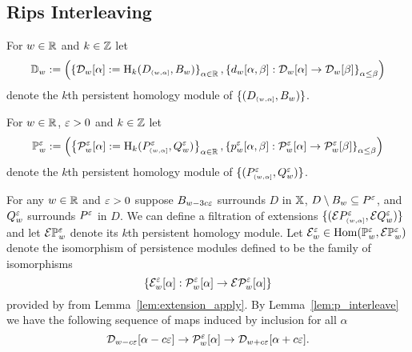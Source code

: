 
\subsection{Rips Interleaving}

For $w\in\mathbb{R}$ and $k\in\mathbb{Z}$ let
\[ \mathbb{D}_{w} := \left(\left\{\mathcal{D}_{w}[\alpha] := \mathrm{H}_k(D_{\scriptscriptstyle (w,\alpha]},B_w)\right\}_{\alpha\in\mathbb{R}},\left\{d_w[\alpha,\beta] : \mathcal{D}_{w}[\alpha]\to\mathcal{D}_{w}[\beta]\right\}_{\alpha\leq\beta}\right)\]
denote the $k$th persistent homology module of $\{(D_{\scriptscriptstyle (w,\alpha]},B_w)\}$.

For $w\in\mathbb{R}$, $\varepsilon > 0$ and $k\in\mathbb{Z}$ let
\[\mathbb{P}_{w}^{\varepsilon} := \left(\left\{\mathcal{P}_{w}^{\varepsilon}[\alpha] := \mathrm{H}_k(P_{\scriptscriptstyle (w,\alpha]}^\varepsilon,Q_w^\varepsilon)\right\}_{\alpha\in\mathbb{R}}, \left\{p_w^\varepsilon[\alpha,\beta] : \mathcal{P}_{w}^{\varepsilon}[\alpha]\to\mathcal{P}_{w}^{\varepsilon}[\beta]\right\}_{\alpha\leq\beta}\right)\]
denote the $k$th persistent homology module of $\{(P_{\scriptscriptstyle (w,\alpha]}^\varepsilon,Q_w^\varepsilon)\}$.

For any $w\in\mathbb{R}$ and $\varepsilon > 0$ suppose $B_{w-3c\varepsilon}$ surrounds $D$ in $\mathbb{X}$, $D\setminus B_w \subseteq P^\varepsilon$, and $Q_w^\varepsilon$ surrounds $P^\varepsilon$ in $D$.
We can define a filtration of extensions $\{(\mathcal{E} P_{\scriptscriptstyle (w,\alpha]}^\varepsilon,\mathcal{E} Q_w^\varepsilon)\}$ and let $\mathcal{E} \mathbb{P}_{w}^{\varepsilon}$ denote its $k$th persistent homology module.
Let
$\mathcal{E}_w^\varepsilon \in \mathrm{Hom}(\mathbb{P}_{w}^{\varepsilon},\mathcal{E} \mathbb{P}_{w}^{\varepsilon})$
denote the isomorphism of persistence modules defined to be the family of isomorphisms
\[ \{\mathcal{E}_w^\varepsilon[\alpha] : \mathcal{P}_{w}^{\varepsilon}[\alpha]\to \mathcal{E} \mathcal{P}_{w}^{\varepsilon}[\alpha]\}\]
provided by from Lemma~\ref{lem:extension_apply}.
By Lemma~\ref{lem:p_interleave} we have the following sequence of maps induced by inclusion for all $\alpha$
\[ \mathcal{D}_{w-c\varepsilon}[\alpha-c\varepsilon]\to \mathcal{P}_{w}^{\varepsilon}[\alpha]\to \mathcal{D}_{w+c\varepsilon}[\alpha+c\varepsilon].\]

%

